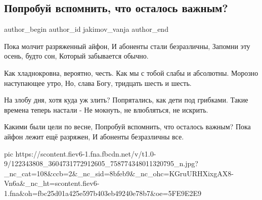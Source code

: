  
 
 
 
 
 
\subsection{Попробуй вспомнить, что осталось важным?}
\label{sec:21_10_2020.fb.jakimov_vanja.1.poprobuj_vspomnit}
\ifcmt
	author_begin
   author_id jakimov_vanja
	author_end
\fi

\begin{multicols}{2}
	\obeycr
Пока молчит разряженный айфон,
И абоненты стали безразличны,
Запомни эту осень, будто сон,
Который забывается обычно.

Как хладнокровна, вероятно, честь.
Как мы с тобой слабы и абсолютны.
Морозно наступающее утро,
Но, слава Богу, тридцать шесть и шесть.

На злобу дня, хотя куда уж злить?
Попрятались, как дети под грибками.
Такие времена теперь настали -
Не мокнуть, не влюбляться, не искрить.

Какими были цели по весне,
Попробуй вспомнить, что осталось важным?
Пока айфон лежит ещё разряжен,
И абоненты безразличны все.
	\restorecr
\end{multicols}

\ifcmt
pic https://scontent.fiev6-1.fna.fbcdn.net/v/t1.0-9/122343808_3604731772912605_758774348011320795_n.jpg?_nc_cat=108&ccb=2&_nc_sid=8bfeb9&_nc_ohc=KGruURHXixgAX8-Vn6a&_nc_ht=scontent.fiev6-1.fna&oh=fbc25d01a425e597b403eb49240e78b7&oe=5FE9E2E9
\fi
